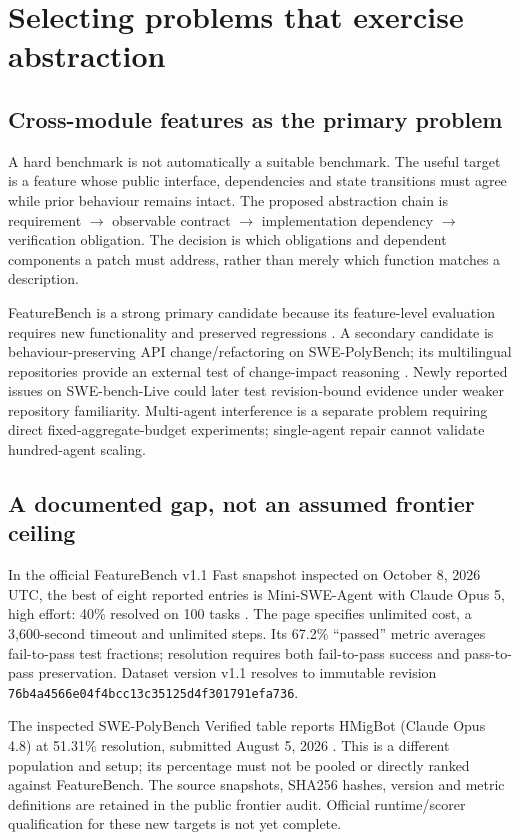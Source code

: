 \documentclass[11pt]{article}
\begin{document}
\section{Selecting problems that exercise abstraction}
\subsection{Cross-module features as the primary problem}
A hard benchmark is not automatically a suitable benchmark. The useful target is a feature whose public interface, dependencies and state transitions must agree while prior behaviour remains intact. The proposed abstraction chain is requirement $\rightarrow$ observable contract $\rightarrow$ implementation dependency $\rightarrow$ verification obligation. The decision is which obligations and dependent components a patch must address, rather than merely which function matches a description.

FeatureBench is a strong primary candidate because its feature-level evaluation requires new functionality and preserved regressions \citep{featurebench}. A secondary candidate is behaviour-preserving API change/refactoring on SWE-PolyBench; its multilingual repositories provide an external test of change-impact reasoning \citep{polybench}. Newly reported issues on SWE-bench-Live could later test revision-bound evidence under weaker repository familiarity. Multi-agent interference is a separate problem requiring direct fixed-aggregate-budget experiments; single-agent repair cannot validate hundred-agent scaling.

\subsection{A documented gap, not an assumed frontier ceiling}
In the official FeatureBench v1.1 Fast snapshot inspected on October 8, 2026 UTC, the best of eight reported entries is Mini-SWE-Agent with Claude Opus 5, high effort: 40\% resolved on 100 tasks \citep{featureleader}. The page specifies unlimited cost, a 3,600-second timeout and unlimited steps. Its 67.2\% ``passed'' metric averages fail-to-pass test fractions; resolution requires both fail-to-pass success and pass-to-pass preservation. Dataset version v1.1 resolves to immutable revision \texttt{76b4a4566e04f4bcc13c35125d4f301791efa736}.

The inspected SWE-PolyBench Verified table reports HMigBot (Claude Opus 4.8) at 51.31\% resolution, submitted August 5, 2026 \citep{polyleader}. This is a different population and setup; its percentage must not be pooled or directly ranked against FeatureBench. The source snapshots, SHA256 hashes, version and metric definitions are retained in the public frontier audit. Official runtime/scorer qualification for these new targets is not yet complete.
\end{document}
